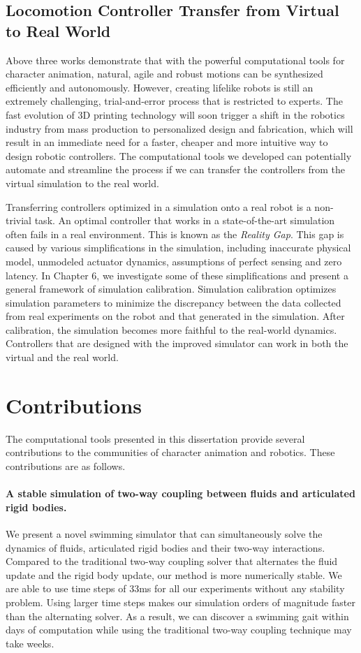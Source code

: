 \subsection{Locomotion Controller Transfer from Virtual to Real World}

Above three works demonstrate that with the powerful computational tools for character animation, natural, agile and robust motions can be synthesized efficiently and autonomously. However, creating lifelike robots is still an extremely challenging, trial-and-error process that is restricted to experts. The fast evolution of 3D printing technology will soon trigger a shift in the robotics industry from mass production to personalized design and fabrication, which will result in an immediate need for a faster, cheaper and more intuitive way to design robotic controllers. The computational tools we developed can potentially automate and streamline the process if we can transfer the controllers from the virtual simulation to the real world.

Transferring controllers optimized in a simulation onto a real robot is a non-trivial task. An optimal controller that works in a state-of-the-art simulation often fails in a real environment. This is known as the \emph{Reality Gap}. This gap is caused by various simplifications in the simulation, including inaccurate physical model, unmodeled actuator dynamics, assumptions of perfect sensing and zero latency. In Chapter 6, we investigate some of these simplifications and present a general framework of simulation calibration. Simulation calibration optimizes simulation parameters to minimize the discrepancy between the data collected from real experiments on the robot and that generated in the simulation. After calibration, the simulation becomes more faithful to the real-world dynamics. Controllers that are designed with the improved simulator can work in both the virtual and the real world. 

\section{Contributions}

The computational tools presented in this dissertation provide several contributions to the communities of character animation and robotics. These contributions are as follows.

\paragraph{A stable simulation of two-way coupling between fluids and articulated rigid bodies.} We present a novel swimming simulator that can simultaneously solve the dynamics of fluids, articulated rigid bodies and their two-way interactions. Compared to the traditional two-way coupling solver that alternates the fluid update and the rigid body update, our method is more numerically stable. We are able to use time steps of 33ms for all our experiments without any stability problem. Using larger time steps makes our simulation orders of magnitude faster than the alternating solver. As a result, we can discover a swimming gait within days of computation while using the traditional two-way coupling technique may take weeks.

